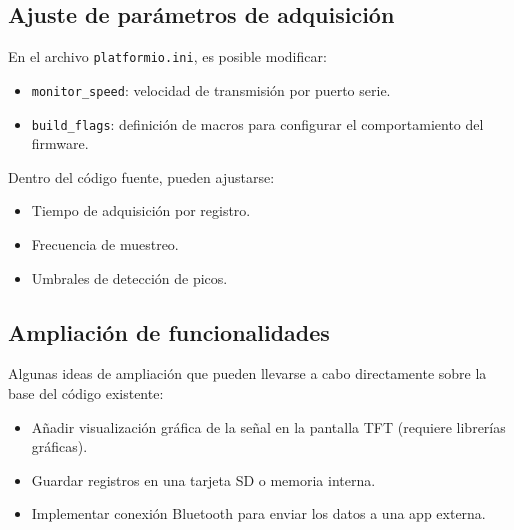 \subsection{Ajuste de parámetros de adquisición}

En el archivo \texttt{platformio.ini}, es posible modificar:

\begin{itemize}
    \item \texttt{monitor\_speed}: velocidad de transmisión por puerto serie.
    \item \texttt{build\_flags}: definición de macros para configurar el comportamiento del firmware.
\end{itemize}

Dentro del código fuente, pueden ajustarse:

\begin{itemize}
    \item Tiempo de adquisición por registro.
    \item Frecuencia de muestreo.
    \item Umbrales de detección de picos.
\end{itemize}

\subsection{Ampliación de funcionalidades}

Algunas ideas de ampliación que pueden llevarse a cabo directamente sobre la base del código existente:

\begin{itemize}
    \item Añadir visualización gráfica de la señal en la pantalla TFT (requiere librerías gráficas).
    \item Guardar registros en una tarjeta SD o memoria interna.
    \item Implementar conexión Bluetooth para enviar los datos a una app externa.
\end{itemize}